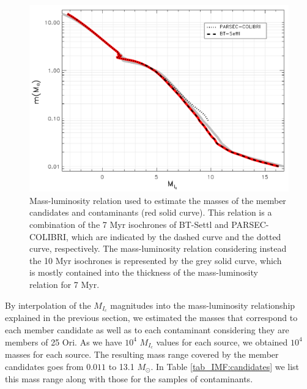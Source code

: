 \documentclass[12pt]{article}
\newcounter{subsubsubsection}[subsubsection]
\begin{document}
\begin{figure}
	\begin{minipage}{0.60\textwidth}
		\includegraphics[width=1.00\textwidth]{mass-MIc}
	\end{minipage} \hfill
	\begin{minipage}{0.38\textwidth}
		\caption[Mass-luminosity relation for estimating masses.]{Mass-luminosity relation used to estimate the masses of the member candidates and contaminants (red solid curve). This relation is a combination of the 7 Myr isochrones of BT-Settl and PARSEC-COLIBRI, which are indicated by the dashed curve and the dotted curve, respectively. The mass-luminosity relation considering instead the 10 Myr isochrones is represented by the grey solid curve, which is mostly contained into the thickness of the mass-luminosity relation for 7 Myr.}
		\label{fig_IMF:mass-L}
	\end{minipage}
\end{figure}

\label{sec_IMF:sys-imf}

By interpolation of the $M_{I_c}$ magnitudes into the mass-luminosity relationship explained in the previous section, we estimated the masses that correspond to each member candidate as well as to each contaminant considering they are members of 25 Ori. As we have $10^4$ $M_{I_c}$ values for each source, we obtained $10^4$ masses for each source. The resulting mass range covered by the member candidates goes from $0.011$ to 13.1 $M_\odot$. In Table \ref{tab_IMF:candidates} we list this mass range along with those for the samples of contaminants.
\end{document}
